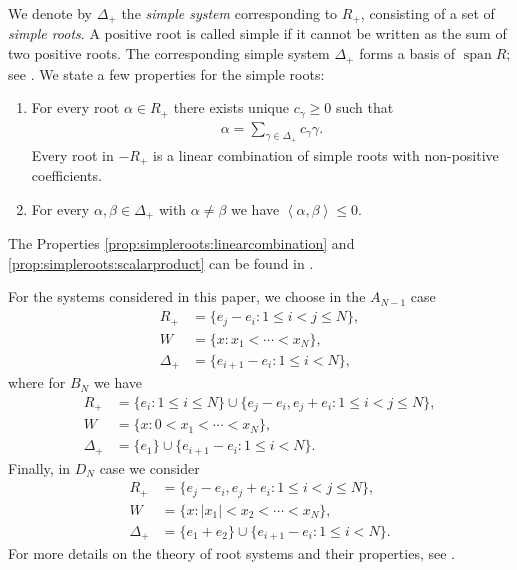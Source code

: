 \documentclass{article}
\numberwithin{equation}{section}
\newcommand{\ab}{\left<\alpha,\beta\right>}
\newcommand{\SimplePlus}{\Delta_+}
\theoremstyle{plain}
\begin{document}
We denote by $\SimplePlus$ the \emph{simple system} corresponding to \( R_+ \), consisting of a set of \emph{simple roots}. A positive root is called simple if it cannot be written as the sum of two positive roots. The corresponding simple system $\Delta_+$ forms a basis of $\operatorname{span}R$; see \cite[Theorem, p. 8]{Humphreys}. 
We state a few properties for the simple roots: 
\begin{enumerate}[label=(S\arabic*), leftmargin=2cm]
    \item \label{prop:simpleroots:linearcombination}
    For every root $\alpha\in R_+$ there exists unique $c_\gamma\geq 0$ such that 
    \begin{align*}
    \alpha = \sum_{\gamma \in \SimplePlus} c_\gamma \gamma.
    \end{align*}
    Every root in \( -R_+ \) is a linear combination of simple roots with non-positive coefficients.
    \item \label{prop:simpleroots:scalarproduct}For every $\alpha,\beta\in\SimplePlus$ with $\alpha\not= \beta$ we have $\ab\leq 0$.
\end{enumerate}
The Properties \ref{prop:simpleroots:linearcombination} and \ref{prop:simpleroots:scalarproduct} can be found in \cite[Theorem, p.~8; Corollary, p.~9]{Humphreys}.

For the systems considered in this paper, we choose in the $A_{N-1}$ case
    \begin{align*}
        R_+ &=\{e_j-e_i:1\leq i<j\leq N\},\\
        W&=\{x:x_1<\cdots<x_N\},\\
        \Delta_+ &=\{e_{i+1}-e_i:1\leq i<N\},
    \end{align*}
    where for $B_N$ we have
    \begin{align*}
        R_+&=\{e_i:1\leq i\leq N\} \cup\{e_j-e_i,e_j+e_i:1\leq i<j\leq N\},\\
        W&=\{x:0<x_1<\cdots<x_N\},\\
        \Delta_+ &=\{e_1\}\cup\{e_{i+1}-e_i:1\leq i<N\}.
    \end{align*}
    Finally, in $D_N$ case we consider
    \begin{align*}
        R_+&=\{e_j-e_i,e_j+e_i:1\leq i<j\leq N\},\\
        W&=\{x:|x_1|<x_2<\cdots<x_N\},\\
        \Delta_+ &=\{e_1+e_2\}\cup\{e_{i+1}-e_i:1\leq i<N\}.
    \end{align*}
For more details on the theory of root systems and their properties, see \cite{Humphreys}.
\end{document}
